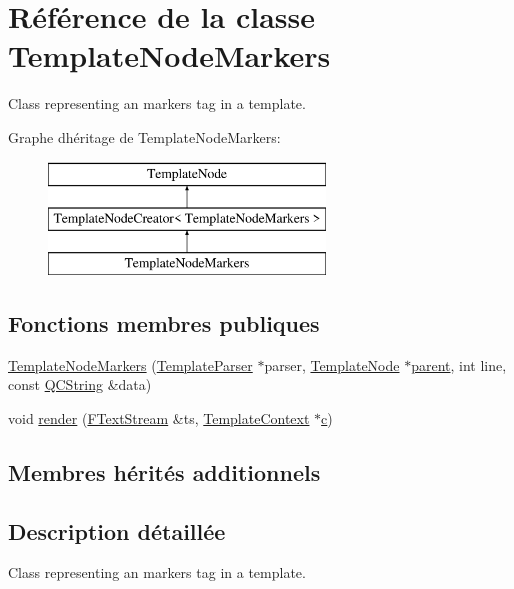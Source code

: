 \hypertarget{class_template_node_markers}{}\section{Référence de la classe Template\+Node\+Markers}
\label{class_template_node_markers}


Class representing an \textquotesingle{}markers\textquotesingle{} tag in a template.  


Graphe d\textquotesingle{}héritage de Template\+Node\+Markers\+:\begin{figure}[H]
\begin{center}
\leavevmode
\includegraphics[height=3.000000cm]{class_template_node_markers}
\end{center}
\end{figure}
\subsection*{Fonctions membres publiques}
\begin{DoxyCompactItemize}
\item 
\hyperlink{class_template_node_markers_afe136c58db97dd9ea08bc8f99d812b59}{Template\+Node\+Markers} (\hyperlink{class_template_parser}{Template\+Parser} $\ast$parser, \hyperlink{class_template_node}{Template\+Node} $\ast$\hyperlink{class_template_node_a69a306ef84e62af9fe57bf9aacc94536}{parent}, int line, const \hyperlink{class_q_c_string}{Q\+C\+String} \&data)
\item 
void \hyperlink{class_template_node_markers_a7778a4c719f4990aa9b3fcc8b0f6fae7}{render} (\hyperlink{class_f_text_stream}{F\+Text\+Stream} \&ts, \hyperlink{class_template_context}{Template\+Context} $\ast$\hyperlink{060__command__switch_8tcl_ab14f56bc3bd7680490ece4ad7815465f}{c})
\end{DoxyCompactItemize}
\subsection*{Membres hérités additionnels}


\subsection{Description détaillée}
Class representing an \textquotesingle{}markers\textquotesingle{} tag in a template. 

